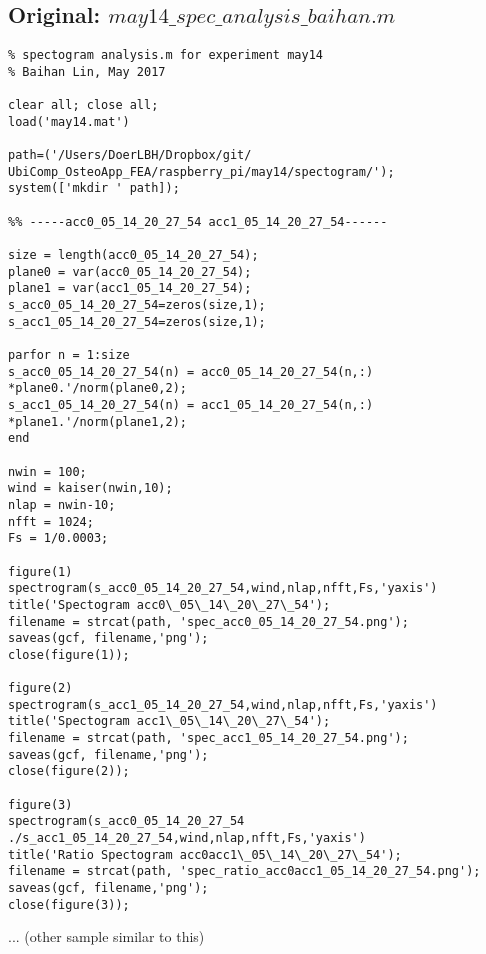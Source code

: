 \documentclass{sigchi}
\begin{document}
\subsection{Original: $may14\_spec\_analysis\_baihan.m$}\label{ss:spc_ana.m}
\begin{lstlisting}
% spectogram analysis.m for experiment may14 
% Baihan Lin, May 2017

clear all; close all;
load('may14.mat')

path=('/Users/DoerLBH/Dropbox/git/
UbiComp_OsteoApp_FEA/raspberry_pi/may14/spectogram/');
system(['mkdir ' path]);

%% -----acc0_05_14_20_27_54 acc1_05_14_20_27_54------

size = length(acc0_05_14_20_27_54);
plane0 = var(acc0_05_14_20_27_54);
plane1 = var(acc1_05_14_20_27_54);
s_acc0_05_14_20_27_54=zeros(size,1);
s_acc1_05_14_20_27_54=zeros(size,1);

parfor n = 1:size
s_acc0_05_14_20_27_54(n) = acc0_05_14_20_27_54(n,:)
*plane0.'/norm(plane0,2);
s_acc1_05_14_20_27_54(n) = acc1_05_14_20_27_54(n,:)
*plane1.'/norm(plane1,2);
end

nwin = 100;
wind = kaiser(nwin,10);
nlap = nwin-10;
nfft = 1024;
Fs = 1/0.0003;

figure(1)
spectrogram(s_acc0_05_14_20_27_54,wind,nlap,nfft,Fs,'yaxis')
title('Spectogram acc0\_05\_14\_20\_27\_54');
filename = strcat(path, 'spec_acc0_05_14_20_27_54.png');
saveas(gcf, filename,'png');
close(figure(1));

figure(2)
spectrogram(s_acc1_05_14_20_27_54,wind,nlap,nfft,Fs,'yaxis')
title('Spectogram acc1\_05\_14\_20\_27\_54');
filename = strcat(path, 'spec_acc1_05_14_20_27_54.png');
saveas(gcf, filename,'png');
close(figure(2));

figure(3)
spectrogram(s_acc0_05_14_20_27_54
./s_acc1_05_14_20_27_54,wind,nlap,nfft,Fs,'yaxis')
title('Ratio Spectogram acc0acc1\_05\_14\_20\_27\_54');
filename = strcat(path, 'spec_ratio_acc0acc1_05_14_20_27_54.png');
saveas(gcf, filename,'png');
close(figure(3));
\end{lstlisting}
... (other sample similar to this)
\end{document}
